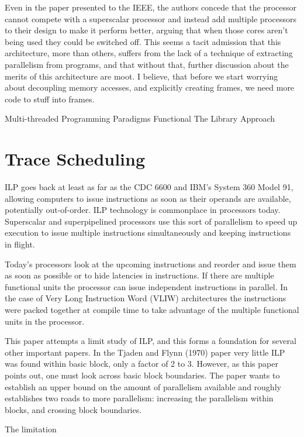 \documentclass[12pt,twoside,letterpaper]{article}
\begin{document}
Even in the paper presented to the IEEE, the authors concede that the processor cannot compete with a superscalar processor and instead add multiple processors to their design to make it perform better, arguing that when those cores aren’t being used they could be switched off. This seems a tacit admission that this architecture, more than others, suffers from the lack of a technique of extracting parallelism from programs, and that without that, further discussion about the merits of this architecture are moot. I believe, that before we start worrying about decoupling memory accesses, and explicitly creating frames, we need  more code to stuff into frames. 

Multi-threaded Programming Paradigms
Functional
The Library Approach

\section*{Trace Scheduling}










ILP goes back at least as far as the CDC 6600 and IBM’s System 360 Model 91, allowing computers to issue instructions as soon as their operands are available, potentially out-of-order. ILP technology is commonplace in processors today. Superscalar and superpipelined processors use this sort of parallelism to speed up execution to issue multiple instructions simultaneously and keeping instructions in flight.

Today’s processors look at the upcoming instructions and reorder and issue them as soon as possible or to hide latencies in instructions. If there are multiple functional units the processor can issue independent instructions in parallel. In the case of Very Long Instruction Word (VLIW) architectures the instructions were packed together at compile time to take advantage of the multiple functional units in the processor.

This paper attempts a limit study of ILP, and this forms a foundation for several other important papers. In the Tjaden and Flynn (1970) paper very little ILP was found within basic block, only a factor of 2 to 3. However, as this paper points out, one must look across basic block boundaries. The paper wants to establish an upper bound on the amount of parallelism available and roughly establishes two roads to more parallelism: increasing the parallelism within blocks, and crossing block boundaries.

The limitation 


\end{document}
